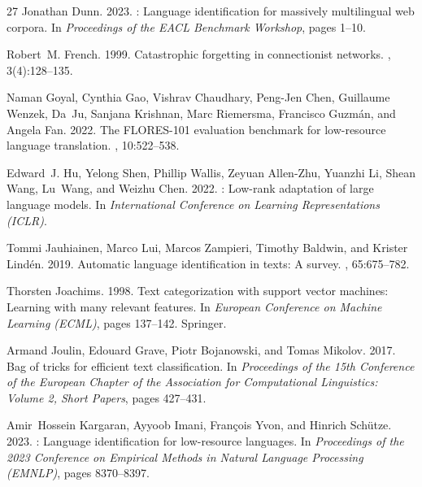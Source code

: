 \documentclass[11pt]{article}
\begin{document}
\begin{thebibliography}{27}
Jonathan Dunn. 2023.
: Language identification for massively multilingual web corpora.
\newblock In {\em Proceedings of the EACL Benchmark Workshop}, pages 1--10.

Robert~M. French. 1999.
\newblock Catastrophic forgetting in connectionist networks.
, 3(4):128--135.

Naman Goyal, Cynthia Gao, Vishrav Chaudhary, Peng-Jen Chen, Guillaume Wenzek, Da~Ju, Sanjana Krishnan, Marc Riemersma, Francisco Guzm{\'a}n, and Angela Fan. 2022.
\newblock The {FLORES-101} evaluation benchmark for low-resource language translation.
, 10:522--538.

Edward~J. Hu, Yelong Shen, Phillip Wallis, Zeyuan Allen-Zhu, Yuanzhi Li, Shean Wang, Lu~Wang, and Weizhu Chen. 2022.
: Low-rank adaptation of large language models.
\newblock In {\em International Conference on Learning Representations (ICLR)}.

Tommi Jauhiainen, Marco Lui, Marcos Zampieri, Timothy Baldwin, and Krister Lind{\'e}n. 2019.
\newblock Automatic language identification in texts: A survey.
, 65:675--782.

Thorsten Joachims. 1998.
\newblock Text categorization with support vector machines: Learning with many relevant features.
\newblock In {\em European Conference on Machine Learning (ECML)}, pages 137--142. Springer.

Armand Joulin, Edouard Grave, Piotr Bojanowski, and Tomas Mikolov. 2017.
\newblock Bag of tricks for efficient text classification.
\newblock In {\em Proceedings of the 15th Conference of the European Chapter of the Association for Computational Linguistics: Volume 2, Short Papers}, pages 427--431.

Amir~Hossein Kargaran, Ayyoob Imani, Fran{\c{c}}ois Yvon, and Hinrich Sch{\"u}tze. 2023.
: Language identification for low-resource languages.
\newblock In {\em Proceedings of the 2023 Conference on Empirical Methods in Natural Language Processing (EMNLP)}, pages 8370--8397.


\end{thebibliography}
\end{document}
